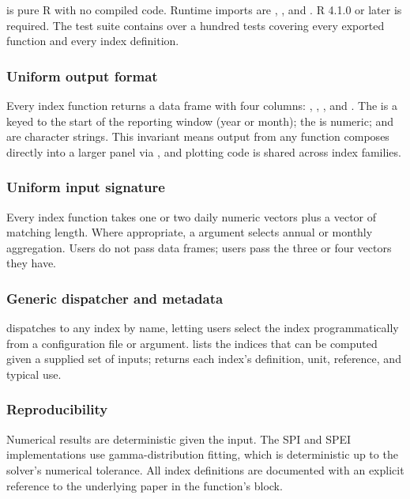  is pure R with no compiled code. Runtime imports
are , , and . R 4.1.0 or later is
required. The test suite contains over a hundred tests covering every
exported function and every index definition.

\subsubsection{Uniform output format}\label{uniform-output-format}

Every index function returns a data frame with four columns:
, , , and . The
 is a  keyed to the start of the reporting
window (year or month); the  is numeric;  and
 are character strings. This invariant means output from any
function composes directly into a larger panel via , and
plotting code is shared across index families.

\subsubsection{Uniform input signature}\label{uniform-input-signature}

Every index function takes one or two daily numeric vectors plus a
 vector of matching length. Where appropriate, a
 argument selects annual or monthly aggregation. Users do
not pass data frames; users pass the three or four vectors they have.

\subsubsection{Generic dispatcher and
metadata}\label{generic-dispatcher-and-metadata}

 dispatches to any index by name, letting users
select the index programmatically from a configuration file or argument.
 lists the indices that can be computed given a
supplied set of inputs;  returns each index's
definition, unit, reference, and typical use.

\subsubsection{Reproducibility}\label{reproducibility}

Numerical results are deterministic given the input. The SPI and SPEI
implementations use gamma-distribution fitting, which is deterministic
up to the solver's numerical tolerance. All index definitions are
documented with an explicit reference to the underlying paper in the
function's  block.

